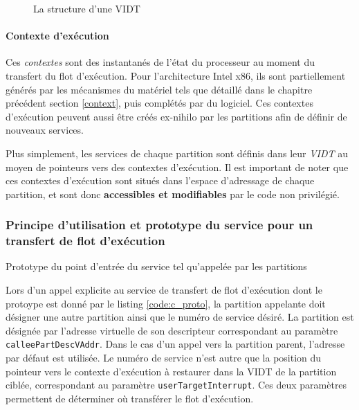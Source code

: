 \begin{figure}[!ht]
	\centering
	
	\caption{La structure d'une VIDT}
	\label{fig:vidt}
\end{figure}

	\paragraph{Contexte d'exécution} Ces \emph{contextes} sont des instantanés de l'état du processeur au moment du transfert du flot d'exécution. Pour l'architecture Intel x86, ils sont partiellement générés par les mécanismes du matériel tels que détaillé dans le chapitre précédent section \ref{context}, puis complétés par du logiciel. Ces contextes d'exécution peuvent aussi être créés ex-nihilo par les partitions afin de définir de nouveaux services.


Plus simplement, les services de chaque partition sont définis dans leur \emph{VIDT} au moyen de pointeurs vers des contextes d'exécution. Il est important de noter que ces contextes d'exécution sont situés dans l'espace d'adressage de chaque partition, et sont donc \textbf{accessibles et modifiables} par le code non privilégié.

	\subsubsection{Principe d'utilisation et prototype du service pour un transfert de flot d'exécution}
	\label{sec:service_usage}
	\begin{listing}[!ht]
		\caption{Prototype du point d'entrée du service tel qu'appelée par les partitions}
		\label{code:c_proto}
	\end{listing}

	Lors d'un appel explicite au service de transfert de flot d'exécution dont le protoype est donné par le listing \ref{code:c_proto}, la partition appelante doit désigner une autre partition ainsi que le numéro de service désiré. La partition est désignée par l'adresse virtuelle de son descripteur correspondant au paramètre \texttt{calleePartDescVAddr}. Dans le cas d'un appel vers la partition parent, l'adresse par défaut est utilisée. Le numéro de service n'est autre que la position du pointeur vers le contexte d'exécution à restaurer dans la VIDT de la partition ciblée, correspondant au paramètre \texttt{userTargetInterrupt}. Ces deux paramètres permettent de déterminer où transférer le flot d'exécution.

